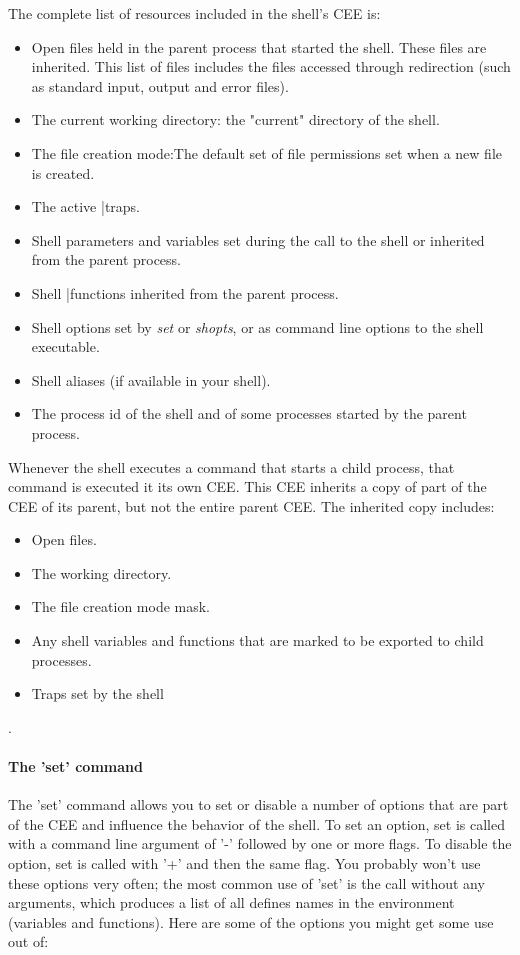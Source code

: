 The complete list of resources included in the shell's CEE is:
\begin{itemize}
\item Open files held in the parent process that started the shell. These files
are inherited. This list of files includes the files accessed through
redirection (such as standard input, output and error files).
\item The current working directory: the "current" directory of the shell.
\item The file creation mode:The default set of file permissions set when a new
file is created.
\item The active |traps.
\item Shell parameters and variables set during the call to the shell or
inherited from the parent process.
\item Shell |functions inherited from the parent process.
\item Shell options set by \textit{set} or \textit{shopts}, or as command line
options to the shell executable.
\item Shell aliases (if available in your shell).
\item The process id of the shell and of some processes started by the parent
process.
\end{itemize}

Whenever the shell executes a command that starts a child process, that command
is executed it its own CEE. This CEE inherits a copy of part of the CEE of its
parent, but not the entire parent CEE. The inherited copy includes:

\begin{itemize}
\item Open files.
\item The working directory.
\item The file creation mode mask.
\item Any shell variables and functions that are marked to be exported to child processes.
\item Traps set by the shell
\end{itemize}.

\paragraph{The 'set' command}
The 'set' command allows you to set or disable a number of options that are
part of the CEE and influence the behavior of the shell. To set an option, set
is called with a command line argument of '-' followed by one or more flags. To
disable the option, set is called with '+' and then the same flag. You probably
won't use these options very often; the most common use of 'set' is the call
without any arguments, which produces a list of all defines names in the
environment (variables and functions). Here are some of the options you might
get some use out of:

